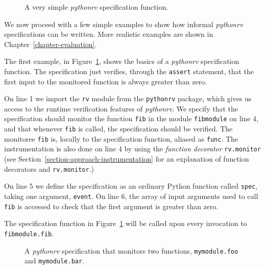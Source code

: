 \documentclass[a4paper,11pt]{kth-mag}
\theoremstyle{definition}
\begin{document}
\begin{figure}[h!]
	\begin{center}
	\begin{minipage}{0.5\textwidth}
	
	\end{minipage}
	\end{center}

  \caption{A very simple \textit{pythonrv} specification function.}
	\label{figure-syntax-example-1}
\end{figure}

We now proceed with a few simple examples to show how informal
\textit{pythonrv} specifications can be written. More realistic examples are
shown in Chapter~\ref{chapter-evaluation}.

The first example, in Figure~\ref{figure-syntax-example-1}, shows the basics of
a \textit{pythonrv} specification function. The specification just verifies,
through the \texttt{assert} statement, that the first input to the monitored
function is always greater than zero.

On line 1 we import the \texttt{rv} module from the \texttt{pythonrv} package,
which gives us access to the runtime verification features of
\textit{pythonrv}. We specify that the specification should monitor the
function \texttt{fib} in the module \texttt{fibmodule} on line 4, and that
whenever \texttt{fib} is called, the specification should be verified. The
monitoree \texttt{fib} is, locally to the specification function, aliased as
\texttt{func}. The instrumentation is also done on line 4 by using the
\textit{function decorator} \texttt{rv.monitor} (see
  Section~\ref{section-approach-instrumentation} for an explanation of function
decorators and \texttt{rv.monitor}.)

On line 5 we define the specification as an ordinary Python function called
\texttt{spec}, taking one argument, \texttt{event}. On line 6, the array of
input arguments used to call \texttt{fib} is accessed to check that the first
argument is greater than zero.

The specification function in Figure~\ref{figure-syntax-example-1} will be
called upon every invocation to \texttt{fibmodule.fib}.

\begin{figure}[h!]
	\begin{center}
	\begin{minipage}{0.7\textwidth}
	
	\end{minipage}
	\end{center}

  \caption{A \textit{pythonrv} specification that monitors two functions,
    \texttt{mymodule.foo} and \texttt{mymodule.bar}.}
	\label{figure-syntax-example-2}
\end{figure}
\end{document}
